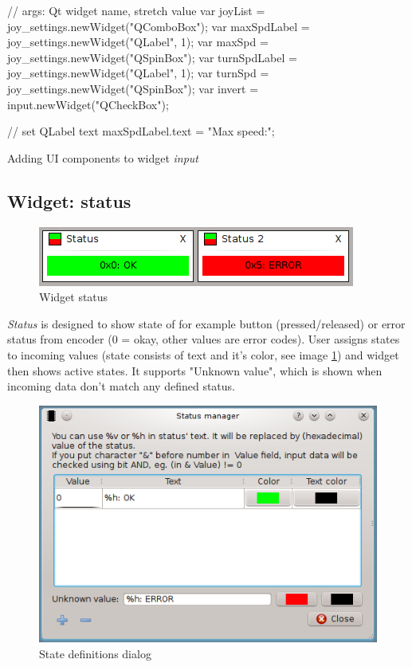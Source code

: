 \documentclass[12pt, a4paper, oneside]{article}
\newcommand{\It}{\textit}  %
\begin{document}
\begin{listing}[H]
\begin{jscode}
// args: Qt widget name, stretch value
var joyList = joy_settings.newWidget("QComboBox");
var maxSpdLabel = joy_settings.newWidget("QLabel", 1);
var maxSpd = joy_settings.newWidget("QSpinBox");
var turnSpdLabel = joy_settings.newWidget("QLabel", 1);
var turnSpd = joy_settings.newWidget("QSpinBox");
var invert = input.newWidget("QCheckBox");

// set QLabel text
maxSpdLabel.text = "Max speed:";
\end{jscode}
\caption{Adding UI components to widget \It{input}}
\label{input_script}
\end{listing}

\subsection{Widget: status}
\begin{figure}[H]
\begin{center}
\includegraphics[scale=1]{img/w_status.png}
\caption{Widget status}
\end{center}
\end{figure}
\It{Status} is designed to show state of for example button (pressed/released) or error status from encoder (0 = okay, other values are error codes). User assigns states to incoming values (state consists of text and it's color, see image \ref{status_dlg}) and widget then shows active states. It supports "Unknown value", which is shown when incoming data don't match any defined status.
\begin{figure}[H]
\begin{center}
\includegraphics[scale=1]{img/w_status_dlg.png}
\caption{State definitions dialog}
\label{status_dlg}
\end{center}
\end{figure} 
\end{document}
